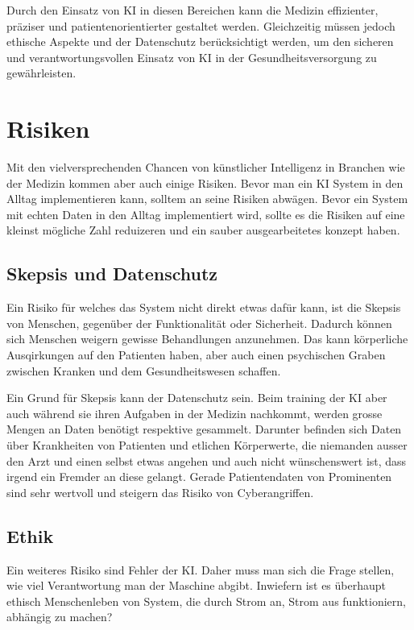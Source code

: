 \vspace{3mm} \noindent
Durch den Einsatz von KI in diesen Bereichen kann die Medizin effizienter, präziser und patientenorientierter gestaltet werden. 
Gleichzeitig müssen jedoch ethische Aspekte und der Datenschutz berücksichtigt werden, um den sicheren und verantwortungsvollen Einsatz von KI in der Gesundheitsversorgung zu gewährleisten.

\section{Risiken}
Mit den vielversprechenden Chancen von künstlicher Intelligenz in Branchen wie der Medizin kommen aber auch einige Risiken. Bevor man ein KI System in den Alltag implementieren kann, solltem an seine Risiken abwägen.
Bevor ein System mit echten Daten in den Alltag implementiert wird, sollte es die Risiken auf eine kleinst mögliche Zahl reduizeren und ein sauber ausgearbeitetes konzept haben.


\subsection{Skepsis und Datenschutz}
Ein Risiko für welches das System nicht direkt etwas dafür kann, ist die Skepsis von Menschen, gegenüber der Funktionalität oder Sicherheit. 
Dadurch können sich Menschen weigern gewisse Behandlungen anzunehmen. Das kann körperliche Ausqirkungen auf den Patienten haben, aber auch einen psychischen Graben zwischen Kranken und dem Gesundheitswesen schaffen.

Ein Grund für Skepsis kann der Datenschutz sein. Beim training der KI aber auch während sie ihren Aufgaben in der Medizin nachkommt, werden grosse Mengen an Daten benötigt respektive gesammelt. 
Darunter befinden sich Daten über Krankheiten von Patienten und etlichen Körperwerte, die niemanden ausser den Arzt und einen selbst etwas angehen und auch nicht wünschenswert ist, dass irgend ein Fremder an diese gelangt.
Gerade Patientendaten von Prominenten sind sehr wertvoll und steigern das Risiko von Cyberangriffen. 

\subsection{Ethik}
Ein weiteres Risiko sind Fehler der KI. Daher muss man sich die Frage stellen, wie viel Verantwortung man der Maschine abgibt.
Inwiefern ist es überhaupt ethisch Menschenleben von System, die durch Strom an, Strom aus funktioniern, abhängig zu machen?


